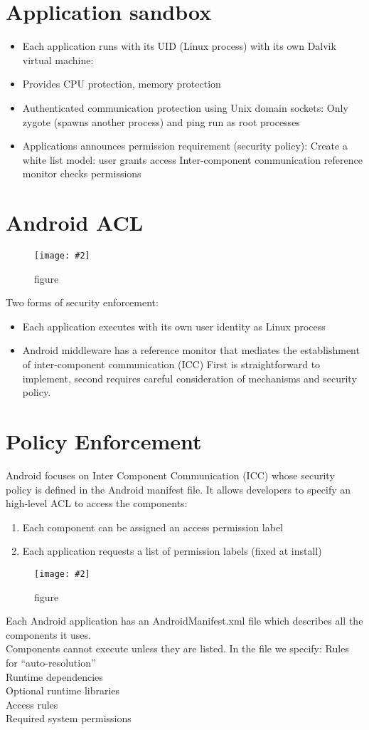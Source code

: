 \documentclass[a4paper,10pt]{scrreprt}
\newcommand{\pic}[2][figure]{\begin{figure}[h]
 \centering
 \texttt{[image: \#2]}
 \caption{#1}
\end{figure}
}
\begin{document}
\section{Application sandbox}
\begin{itemize}

\item Each application runs with its UID (Linux process) with its own Dalvik
virtual machine:
\item Provides CPU protection, memory protection
\item  Authenticated communication protection using
Unix domain sockets:
\subitem Only zygote (spawns another process) and ping
run as root
processes
\item Applications announces permission requirement (security policy):
\subitem Create a white list model: user grants access
\subitem Inter-component communication reference monitor checks
permissions
\end{itemize}

\section{Android ACL}
\pic{anacl.png}
Two forms of security enforcement:
\begin{itemize}
\item Each application executes with its own user identity as Linux
process
\item Android middleware has a reference monitor that mediates the
establishment of inter-component communication (ICC)
First is straightforward to implement, second requires careful consideration
of mechanisms and security policy. 
\end{itemize}

\section{Policy Enforcement}
Android focuses on Inter Component Communication (ICC) whose security
policy is defined in the Android manifest file. It allows developers to specify
an high-level ACL to access the components:
\begin{enumerate}
\item Each component can be assigned an access permission label
\item Each application requests a list of permission labels (fixed at install)
\end{enumerate}
\pic{anman.png}

Each Android application has an AndroidManifest.xml
file which describes all the components it uses.\\
Components cannot execute unless they are listed. In the file we specify:
Rules for “auto-resolution”\\
Runtime dependencies\\
Optional runtime libraries\\
Access rules\\
Required system permissions\\
\end{document}
